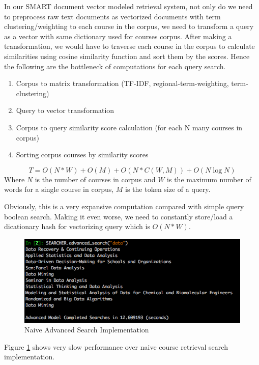 \documentclass[twoside]{article}
\begin{document}
In our SMART document vector modeled retrieval system, not only do we need to preprocess raw text documents as vectorized documents with term clustering/weighting to each course in the corpus, we need to transform a query as a vector with same dictionary used for courses corpus. After making a transformation, we would have to traverse each course in the corpus to calculate similarities using cosine similarity function and sort them by the scores. Hence the following are the bottleneck of computations for each query search.

\begin{enumerate}
\item Corpus to matrix transformation (TF-IDF, regional-term-weighting, term-clustering)
\item Query to vector transformation
\item Corpus to query similarity score calculation (for each N many courses in corpus)
\item Sorting corpus courses by similarity scores
\end{enumerate}

\begin{equation}
T = O(N * W) + O(M) + O( N * C (W, M) ) + O(N \log{N})
\end{equation}
Where $N$ is the number of courses in corpus and $W$ is the maximum number of words for a single course in corpus, $M$ is the token size of a query.

Obviously, this is a very expansive computation compared with simple query boolean search. Making it even worse, we need to constantly store/load a dicationary hash for vectorizing query which is $O(N * W)$. 

\begin{figure}
  \includegraphics[width=\linewidth]{Images/2.png}
  \caption{Naive Advanced Search Implementation}
  \label{fig:naive_advanced_search}
\end{figure}
Figure \ref{fig:naive_advanced_search} shows very slow performance over naive course retrieval search implementation.
\end{document}
